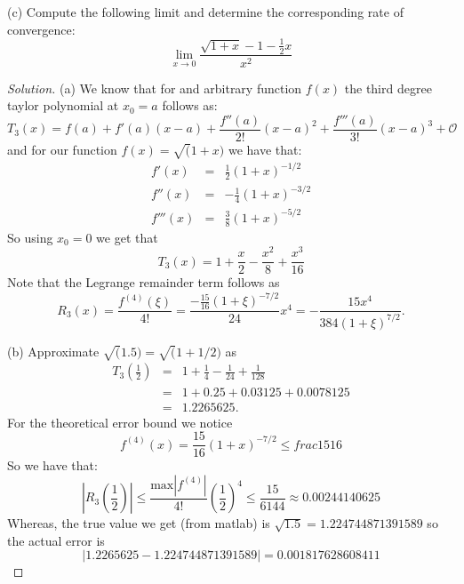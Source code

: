 \documentclass[12pt]{amsart}
\newenvironment{solution}
{\begin{proof}[Solution]}
{\end{proof}}
\begin{document}
\begin{onehalfspace}
        (c) Compute the following limit and determine the corresponding rate of convergence:
        \begin{displaymath}
            \lim_{x\rightarrow 0} \frac{\sqrt{1+x} - 1 - \frac{1}{2}x}{x^2}
        \end{displaymath}
        \begin{solution}
            (a) We know that for and arbitrary function $f(x)$ the third degree taylor polynomial at $x_0 = a$ follows as:
            \begin{displaymath}
                T_3(x) = f(a) + f'(a)(x-a) + \frac{f''(a)}{2!}(x-a)^2 + \frac{f'''(a)}{3!}(x-a)^3 + \mathcal{O}
            \end{displaymath}
            and for our function $f(x) = \sqrt(1+x)$ we have that:
            \begin{eqnarray*}
                f'(x)  & = & \frac{1}{2}(1+x)^{-1/2} \\
                f''(x) & = & -\frac{1}{4}(1+x)^{-3/2} \\
                f'''(x) & = & \frac{3}{8}(1+x)^{-5/2}
            \end{eqnarray*}
            So using $x_0 = 0$ we get that
            \begin{displaymath}
                T_3(x) = 1 + \frac{x}{2} - \frac{x^2}{8} + \frac{x^3}{16}
            \end{displaymath}
            Note that the Legrange remainder term follows as
            \begin{displaymath}
                R_3(x) = \frac{f^{(4)}(\xi)}{4!} = \frac{-\frac{15}{16}(1+\xi)^{-7/2}}{24}x^4 = -\frac{15x^4}{384(1+\xi)^{7/2}}.
            \end{displaymath}

            (b) Approximate $\sqrt(1.5) = \sqrt(1 + 1/2)$ as
            \begin{eqnarray*}
                T_3\left(\frac{1}{2}\right) & = & 1 + \frac{1}{4} - \frac{1}{24} + \frac{1}{128} \\
                 & = & 1 + 0.25 + 0.03125 + 0.0078125 \\
                 & = & 1.2265625.
            \end{eqnarray*}
            For the theoretical error bound we notice
            \begin{displaymath}
                f^{(4)}(x) = \frac{15}{16}(1 + x)^{-7/2} \le frac{15}{16}
            \end{displaymath}
            So we have that:
            \begin{displaymath}
                |R_3\left(\frac{1}{2}\right)| \leq \frac{\text{max}|f^{(4)}|}{4!}\left(\frac{1}{2}\right)^4 \leq \frac{15}{6144} \approx 0.00244140625
            \end{displaymath}
            Whereas, the true value we get (from matlab) is $\sqrt{1.5} = 1.224744871391589$ so the actual error is
            \begin{displaymath}
                |1.2265625 - 1.224744871391589| = 0.001817628608411
            \end{displaymath}


\end{solution}
\end{onehalfspace}
\end{document}
